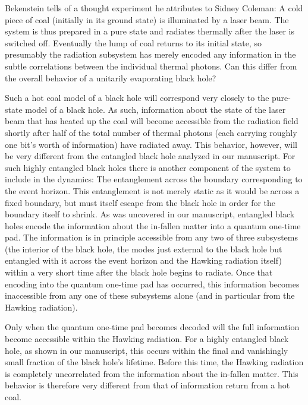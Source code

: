 \documentclass[aps,showpacs,prl,12pt]{revtex4}
\begin{document}
Bekenstein \cite{Bekapp} tells of a thought experiment he attributes to
Sidney Coleman: A cold piece of coal (initially in its ground state) is
illuminated by a laser beam. The system is thus prepared in a pure state
and radiates thermally after the laser is switched off. Eventually
the lump of coal returns to its initial state, so presumably the
radiation subsystem has merely encoded any information in the subtle
correlations between the individual thermal photons. Can this differ
from the overall behavior of a unitarily evaporating black hole?

Such a hot coal model of a black hole will correspond very closely to
the pure-state model of a black hole. As such, information about the state
of the laser beam that has heated up the coal will become accessible
from the radiation field shortly after half of the total number of thermal
photons (each carrying roughly one bit's worth of information) have
radiated away. This behavior, however, will be very different from the
entangled black hole analyzed in our manuscript. For such highly entangled
black holes there is another component of the system to include in the
dynamics: The entanglement across the boundary corresponding to the
event horizon. This entanglement is not merely static  as it would be across
a fixed boundary, but must itself escape from the black hole in order
for the boundary itself to shrink. As was uncovered in our manuscript, 
entangled black holes encode the information about the in-fallen matter
into a quantum one-time pad. The information is in principle accessible
from any two of three subsystems (the interior of the black hole, the
modes just external to the black hole but entangled with it across
the event horizon and the Hawking radiation itself) within a very short
time after the black hole begins to radiate. Once that encoding into
the quantum one-time pad has occurred, this information becomes
inaccessible from any one of these subsystems alone (and in particular
from the Hawking radiation).

Only when the quantum one-time pad becomes decoded will the full information
become accessible within the Hawking radiation. For a highly entangled
black hole, as shown in our manuscript, this occurs within the final
and vanishingly small fraction of the black hole's lifetime. Before
this time, the Hawking radiation is completely uncorrelated from the
information about the in-fallen matter. This behavior is therefore
very different from that of information return from a hot coal.
\end{document}

